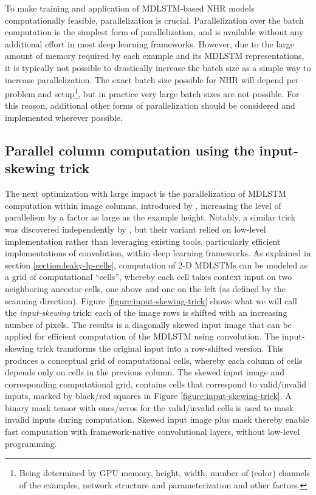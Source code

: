 \documentclass[conference]{IEEEtran}
\renewcommand{\ac}[1]{\gls{#1}}
\renewcommand{\acp}[1]{\glspl{#1}}
\begin{document}
To make  training and application of \ac{MDLSTM}-based \ac{NHR} models computationally feasible, 
parallelization is crucial. 
 Parallelization over the batch computation is the simplest form of parallelization, and is 
available without any additional effort in most deep learning frameworks. 
However, due to the large amount of memory required by each example and its \ac{MDLSTM} representations, 
it is typically not possible to drastically increase the batch size as a simple way to increase parallelization.
The exact batch size possible for \ac{NHR} will depend per problem and setup\footnote{Being determined by GPU memory, height, width, number of (color) channels of the examples, network structure and parameterization and other factors.},
but in practice very large batch sizes are not possible. 
For this reason, additional other forms of parallelization should be considered and implemented wherever possible. 


\subsection{Parallel column computation using the input-skewing trick}
The next optimization with large impact is the parallelization of \ac{MDLSTM} computation within image columns, introduced by \cite{VanDenOord:2016:PixelRecurrentNeuralNetworks},
increasing the level of parallelism by a factor as large as the example height. Notably, a similar trick was discovered
independently by \cite{Voigtlaender2016}, but their variant relied on low-level implementation rather than leveraging existing tools, particularly efficient implementations of convolution, within deep learning frameworks.
As explained in section \ref{section:leaky-lp-cells}, computation of 2-D \acp{MDLSTM} can be modeled as a grid of computational ``cells'', 
whereby each cell takes context input on two neighboring ancestor cells, one above and one on the left (as defined by the scanning direction). 
Figure \ref{figure:input-skewing-trick} shows what we will call the \emph{input-skewing} trick: 
each of the  image rows  is shifted  
with an increasing number of  pixels. The results is a diagonally skewed input image that can be  
applied for efficient computation of the \ac{MDLSTM} using convolution. 
The input-skewing trick transforms the original input into a row-shifted version. This produces a conceptual grid of computational cells,
whereby each column of cells depends only on cells in the previous column. 
The skewed input image and corresponding computational grid, contains cells that correspond to valid/invalid inputs, 
marked by black/red squares in Figure \ref{figure:input-skewing-trick}. 
A binary mask tensor with ones/zeros for the valid/invalid cells is used to mask invalid inputs during computation.
Skewed input image plus mask thereby enable fast computation with framework-native convolutional layers, 
without low-level programming.
\end{document}

